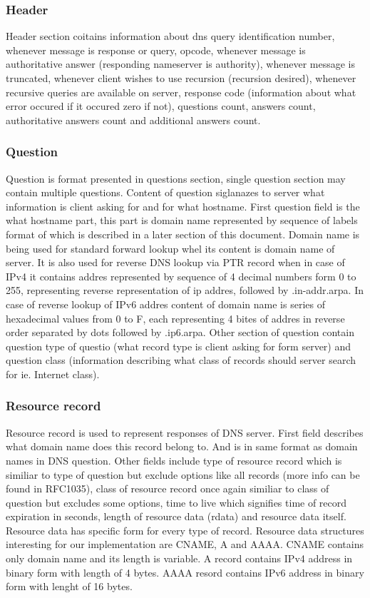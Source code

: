 \documentclass[11pt, a4paper]{article}
\begin{document}
\subsubsection{Header}
Header section coitains information about dns query identification number, whenever message is response or query, opcode,
whenever message is authoritative answer (responding nameserver is authority), whenever message is truncated,
whenever client wishes to use recursion (recursion desired), whenever recursive queries are available on server,
response code (information about what error occured if it occured zero if not), questions count, answers count,
authoritative answers count and additional answers count.
\subsubsection{Question}
Question is format presented in questions section, single question section may contain multiple questions. Content of
question siglanazes to server what information is client asking for and for what hostname. First question field is the
what hostname part, this part is domain name represented by sequence of labels format of which is described in a later 
section of this document. Domain name is being used for standard forward lookup whel its content is domain name of server. 
It is also used for reverse DNS lookup via PTR record when in case of IPv4 it contains addres represented by sequence 
of 4 decimal numbers form 0 to 255, representing reverse representation of ip addres, followed by .in-addr.arpa. In case of
reverse lookup of IPv6 addres content of domain name is series of hexadecimal values from 0 to F, each representing 4 bites of
addres in reverse order separated by dots followed by .ip6.arpa. Other section of question contain question type of questio
(what record type is client asking for form server) and question class (information describing what class of records should server 
search for ie. Internet class).
\subsubsection{Resource record}
Resource record is used to represent responses of DNS server. First field describes what domain name does this record belong to.
And is in same format as domain names in DNS question. Other fields include type of resource record which is similiar to type of
question but exclude options like all records (more info can be found in RFC1035), class of resource record once again similiar to
class of question but excludes some options, time to live which signifies time of record expiration in seconds, length of resource 
data (rdata) and resource data itself. Resource data has specific form for every type of record. Resource data structures interesting
for our implementation are CNAME, A and AAAA. CNAME contains only domain name and its length is variable. A record contains IPv4 address
in binary form with length of 4 bytes. AAAA resord contains IPv6 address in binary form with lenght of 16 bytes.
\end{document}
